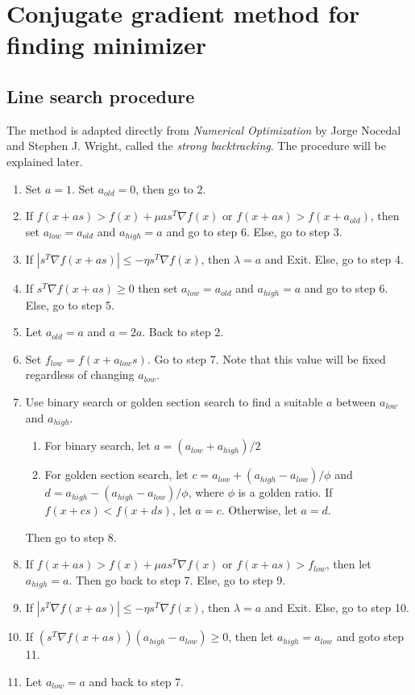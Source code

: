 \documentclass{article}
\begin{document}
\section*{Conjugate gradient method for finding minimizer}

\subsection*{Line search procedure}

The method is adapted directly from \emph{Numerical Optimization} by Jorge Nocedal and Stephen J. Wright, called the \emph{strong backtracking}. The procedure will be explained later.
\begin{enumerate}
    \item Set $a = 1$. Set $a_{old} = 0$, then go to 2.
    \item If $f(x + as) > f(x) + \mu a s^T \nabla f(x)$ or $f(x + a s) > f(x + a_{old})$, then set $a_{low} = a_{old}$ and $a_{high} = a$ and go to step 6. Else, go to step 3.
    \item If $|s^T \nabla f(x + as)| \leq -\eta s^T \nabla f(x)$, then $\lambda = a$ and Exit. Else, go to step 4.
    \item If $s^T \nabla f(x + as) \geq 0$ then set $a_{low} = a_{old}$ and $a_{high} = a$ and go to step 6. Else, go to step 5.
    \item Let $a_{old} = a$ and $a = 2a$. Back to step 2.
    \item Set $f_{low} = f(x + a_{low}s)$. Go to step 7. Note that this value will be fixed regardless of changing $a_{low}$.
    \item Use binary search or golden section search to find a suitable $a$ between $a_{low}$ and $a_{high}$.
    \begin{enumerate}
        \item For binary search, let $a = (a_{low} + a_{high})/2$
        \item For golden section search, let $c = a_{low} + (a_{high} - a_{low})/\phi$ and $d = a_{high} - (a_{high} - a_{low})/\phi$, where $\phi$ is a golden ratio. If $f(x + cs) < f(x + ds)$, let $a = c$. Otherwise, let $a = d$.
    \end{enumerate}
 Then go to step 8.
    \item If $f(x + as) > f(x) + \mu a s^T \nabla f(x)$ or $f(x + a s) > f_{low}$, then let $a_{high} = a$. Then go back to step 7. Else, go to step 9.
    \item If $|s^T \nabla f(x + as)| \leq -\eta s^T \nabla f(x)$, then $\lambda = a$ and Exit. Else, go to step 10.
    \item If $(s^T \nabla f(x + as))(a_{high} - a_{low}) \geq 0$, then let $a_{high} = a_{low}$ and goto step 11.
    \item Let $a_{low} = a$ and back to step 7.
\end{enumerate}
\end{document}
